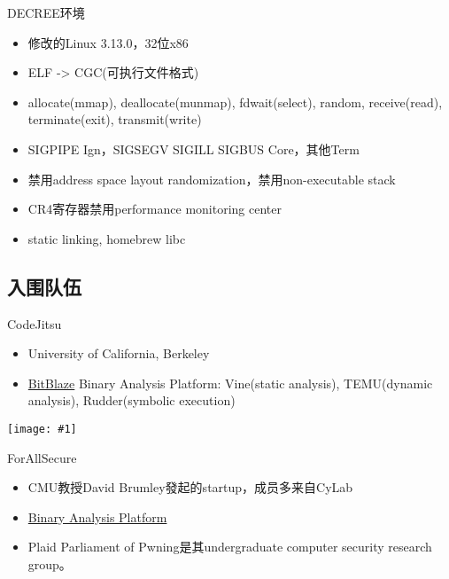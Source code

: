 \documentclass{beamer}
\newcommand{\image}[1]{
  \begin{frame}
    \texttt{[image: \#1]}
  \end{frame}
}
\begin{document}
\begin{frame}
  \begin{block}{DECREE环境}
    \begin{itemize}
      \item 修改的Linux 3.13.0，32位x86
      \item ELF -> CGC(可执行文件格式)
      \item allocate(mmap), deallocate(munmap), fdwait(select), random, receive(read), terminate(exit), transmit(write)
      \item SIGPIPE Ign，SIGSEGV SIGILL SIGBUS Core，其他Term
      \item 禁用address space layout randomization，禁用non-executable stack
      \item CR4寄存器禁用performance monitoring center
      \item static linking, homebrew libc
    \end{itemize}
  \end{block}
\end{frame}

\subsection{入围队伍}

\begin{frame}
  \begin{block}{CodeJitsu}
    \begin{itemize}
      \item University of California, Berkeley
      \item \href{http://bitblaze.cs.berkeley.edu/}{BitBlaze} Binary Analysis Platform: Vine(static analysis), TEMU(dynamic analysis), Rudder(symbolic execution)
    \end{itemize}
  \end{block}
\end{frame}

\image{img/codejitsu.jpg}

\begin{frame}
  \begin{block}{ForAllSecure}
    \begin{itemize}
      \item CMU教授David Brumley發起的startup，成员多来自CyLab
      \item \href{https://github.com/BinaryAnalysisPlatform}{Binary
          Analysis Platform}
      \item Plaid Parliament of Pwning是其undergraduate computer security research group。
    \end{itemize}
  \end{block}
\end{frame}
\end{document}
